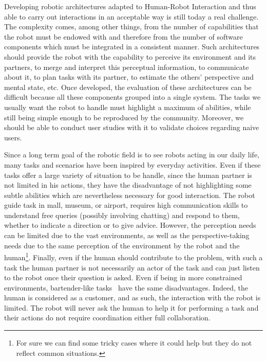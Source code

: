 Developing robotic architectures adapted to Human-Robot Interaction and thus able to carry out interactions in an acceptable way is still today a real challenge. The complexity comes, among other things, from the number of capabilities that the robot must be endowed with and therefore from the number of software components which must be integrated in a consistent manner. Such architectures should provide the robot with the capability to perceive its environment and its partners, to merge and interpret this perceptual information, to communicate about it, to plan tasks with its partner, to estimate the others' perspective and mental state, etc. Once developed, the evaluation of these architectures can be difficult because all these components grouped into a single system. The tasks we usually want the robot to handle must highlight a maximum of abilities, while still being simple enough to be reproduced by the community. Moreover, we should be able to conduct user studies with it to validate choices regarding naive users.

Since a long term goal of the robotic field is to see robots acting in our daily life, many tasks and scenarios have been inspired by everyday activities. Even if these tasks offer a large variety of situation to be handle, since the human partner is not limited in his actions, they have the disadvantage of not highlighting some subtle abilities which are nevertheless necessary for good interaction.
The robot guide task \cite{satake_2015_should} in mall, museum, or airport, requires high communication skills to understand free queries (possibly involving chatting) and respond to them, whether to indicate a direction or to give advice. However, the perception needs can be limited due to the vast environments, as well as the perspective-taking needs due to the same perception of the environment by the robot and the human\footnote{For sure we can find some tricky cases where it could help but they do not reflect common situations.}. Finally, even if the human should contribute to the problem, with such a task the human partner is not necessarily an actor of the task and can just listen to the robot once their question is asked. Even if being in more constrained environments, bartender-like tasks~\cite{petrick_2012_social} have the same disadvantages. Indeed, the human is considered as a customer, and as such, the interaction with the robot is limited. The robot will never ask the human to help it for performing a task and their actions do not require coordination either full collaboration.

